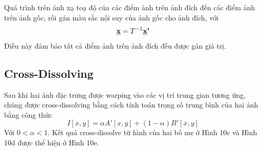 \documentclass[conference]{IEEEtran}
\begin{document}
Quá trình trên ánh xạ toạ độ của các điểm ảnh trên ảnh đích đến các điểm ảnh trên ảnh gốc, rồi gán màu sắc nội suy của ảnh gốc cho ảnh đích, với \[\textbf{\underline{x}} = T^{-1}\textbf{\underline{x}'}\]
Điều này đảm bảo tất cả điểm ảnh trên ảnh đích đều được gán giá trị.

\subsection{Cross-Dissolving}
Sau khi hai ảnh đặc trưng được warping vào các vị trí trung gian tương ứng, chúng được cross-dissolving bằng cách tính toán trọng số trung bình của hai ảnh bằng công thức
\[I[x,y]=\alpha A'[x,y]+(1-\alpha) B'[x,y]\]
Với $0 < \alpha < 1$. Kết quả cross-dissolve từ hình của hai bố mẹ ở Hình 10c và Hình 10d được thể hiện ở Hình 10e.
\end{document}
